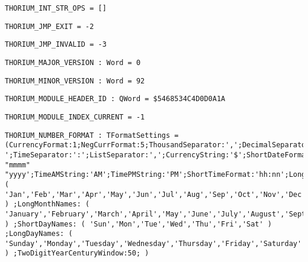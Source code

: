 \begin{verbatim}
THORIUM_INT_STR_OPS = []
\end{verbatim}
\label{thoriumcore:thorium:thoriumintstrops}



\begin{verbatim}
THORIUM_JMP_EXIT = -2
\end{verbatim}
\label{thoriumcore:thorium:thoriumjmpexit}



\begin{verbatim}
THORIUM_JMP_INVALID = -3
\end{verbatim}
\label{thoriumcore:thorium:thoriumjmpinvalid}



\begin{verbatim}
THORIUM_MAJOR_VERSION : Word = 0
\end{verbatim}
\label{thoriumcore:thorium:thoriummajorversion}



\begin{verbatim}
THORIUM_MINOR_VERSION : Word = 92
\end{verbatim}
\label{thoriumcore:thorium:thoriumminorversion}



\begin{verbatim}
THORIUM_MODULE_HEADER_ID : QWord = $5468534C4D0D0A1A
\end{verbatim}
\label{thoriumcore:thorium:thoriummoduleheaderid}



\begin{verbatim}
THORIUM_MODULE_INDEX_CURRENT = -1
\end{verbatim}
\label{thoriumcore:thorium:thoriummoduleindexcurrent}



\begin{verbatim}
THORIUM_NUMBER_FORMAT : TFormatSettings = (CurrencyFormat:1;NegCurrFormat:5;ThousandSeparator:',';DecimalSeparator:'.';CurrencyDecimals:2;DateSeparator:'-';TimeSeparator:':';ListSeparator:',';CurrencyString:'$';ShortDateFormat:'d/m/y';LongDateFormat:'dd" "mmmm" "yyyy';TimeAMString:'AM';TimePMString:'PM';ShortTimeFormat:'hh:nn';LongTimeFormat:'hh:nn:ss';ShortMonthNames: ( 'Jan','Feb','Mar','Apr','May','Jun','Jul','Aug','Sep','Oct','Nov','Dec' ) ;LongMonthNames: ( 'January','February','March','April','May','June','July','August','September','October','November','December' ) ;ShortDayNames: ( 'Sun','Mon','Tue','Wed','Thu','Fri','Sat' ) ;LongDayNames: ( 'Sunday','Monday','Tuesday','Wednesday','Thursday','Friday','Saturday' ) ;TwoDigitYearCenturyWindow:50; )
\end{verbatim}
\label{thoriumcore:thorium:thoriumnumberformat}



